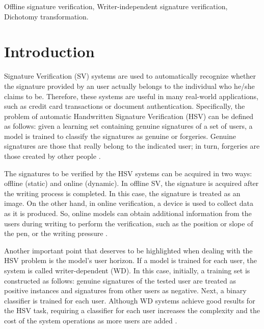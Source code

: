 \documentclass[conference]{IEEEtran}
\begin{document}
\begin{IEEEkeywords}
Offline signature verification, Writer-independent signature verification, Dichotomy transformation.
\end{IEEEkeywords}

\section{Introduction}

Signature Verification (SV) systems are used to automatically recognize whether the signature provided by an user actually belongs to the individual who he/she claims to be. Therefore, these systems are useful in many real-world applications, such as credit card transactions or document authentication. Specifically, the problem of automatic Handwritten Signature Verification (HSV) can be defined as follows: given a learning set containing genuine signatures of a set of users, a model is trained to classify the signatures as genuine or forgeries. Genuine signatures are those that really belong to the indicated user; in turn, forgeries are those created by other people \cite{hafemann_review:17}.

The signatures to be verified by the HSV systems can be acquired in two ways: offline (static) and online (dynamic). In offline SV, the signature is acquired after the writing process is completed. In this case, the signature is treated as an image. On the other hand, in online verification, a device is used to collect data as it is produced. So, online models can obtain additional information from the users during writing to perform the verification, such as the position or slope of the pen, or the writing pressure \cite{hafemann_review:17}.

Another important point that deserves to be highlighted when dealing with the HSV problem is the model's user horizon. If a model is trained for each user, the system is called writer-dependent (WD). In this case, initially, a training set is constructed as follows: genuine signatures of the tested user are treated as positive instances and signatures from other users as negative. Next, a binary classifier is trained for each user. Although WD systems achieve good results for the HSV task, requiring a classifier for each user increases the complexity and the cost of the system operations as more users are added \cite{kumar:16}.
\end{document}
